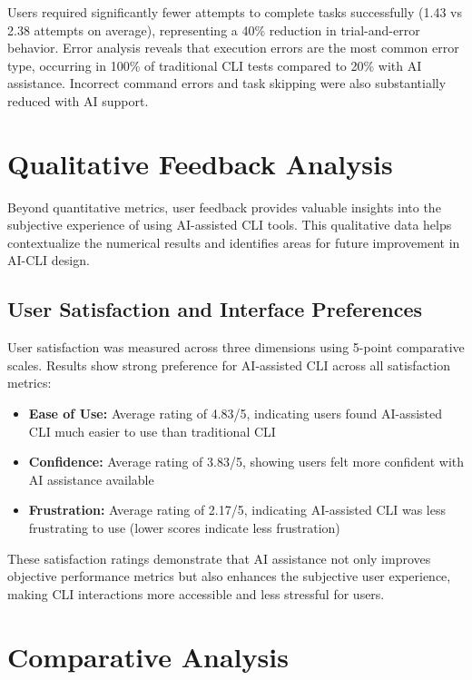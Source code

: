 Users required significantly fewer attempts to complete tasks successfully (1.43 vs 2.38 attempts on average), representing a 40\% reduction in trial-and-error behavior. Error analysis reveals that execution errors are the most common error type, occurring in 100\% of traditional CLI tests compared to 20\% with AI assistance. Incorrect command errors and task skipping were also substantially reduced with AI support.

\section{Qualitative Feedback Analysis}

Beyond quantitative metrics, user feedback provides valuable insights into the subjective experience of using AI-assisted CLI tools. This qualitative data helps contextualize the numerical results and identifies areas for future improvement in AI-CLI design.

\subsection{User Satisfaction and Interface Preferences}

User satisfaction was measured across three dimensions using 5-point comparative scales. Results show strong preference for AI-assisted CLI across all satisfaction metrics:

\begin{itemize}
	\item \textbf{Ease of Use:} Average rating of 4.83/5, indicating users found AI-assisted CLI much easier to use than traditional CLI
	\item \textbf{Confidence:} Average rating of 3.83/5, showing users felt more confident with AI assistance available
	\item \textbf{Frustration:} Average rating of 2.17/5, indicating AI-assisted CLI was less frustrating to use (lower scores indicate less frustration)
\end{itemize}

These satisfaction ratings demonstrate that AI assistance not only improves objective performance metrics but also enhances the subjective user experience, making CLI interactions more accessible and less stressful for users.

\section{Comparative Analysis}

